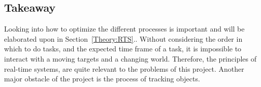 \subsection{Takeaway}
Looking into how to optimize the different processes is important and will be elaborated upon in Section~\ref{Theory:RTS}..
Without considering the order in which to do tasks, and the expected time frame of a task, it is impossible to interact with a moving targets and a changing world. 
Therefore, the principles of real-time systems, are quite relevant to the problems of this project.
Another major obstacle of the project is the process of tracking objects.
